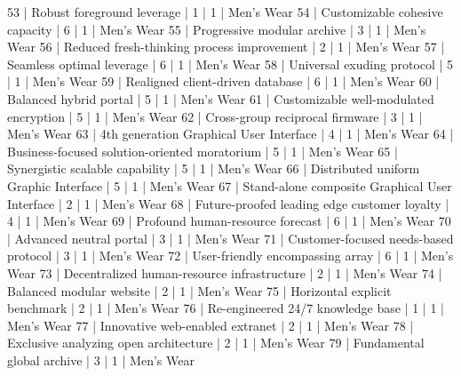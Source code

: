 \begin{enumerate}
\begin{pseudo*}
      53 | Robust foreground leverage                       |        1 |      1 | Men's Wear    
      54 | Customizable cohesive capacity                   |        6 |      1 | Men's Wear    
      55 | Progressive modular archive                      |        3 |      1 | Men's Wear    
      56 | Reduced fresh-thinking process improvement       |        2 |      1 | Men's Wear    
      57 | Seamless optimal leverage                        |        6 |      1 | Men's Wear    
      58 | Universal exuding protocol                       |        5 |      1 | Men's Wear    
      59 | Realigned client-driven database                 |        6 |      1 | Men's Wear    
      60 | Balanced hybrid portal                           |        5 |      1 | Men's Wear    
      61 | Customizable well-modulated encryption           |        5 |      1 | Men's Wear    
      62 | Cross-group reciprocal firmware                  |        3 |      1 | Men's Wear    
      63 | 4th generation Graphical User Interface          |        4 |      1 | Men's Wear    
      64 | Business-focused solution-oriented moratorium    |        5 |      1 | Men's Wear    
      65 | Synergistic scalable capability                  |        5 |      1 | Men's Wear    
      66 | Distributed uniform Graphic Interface            |        5 |      1 | Men's Wear    
      67 | Stand-alone composite Graphical User Interface   |        2 |      1 | Men's Wear    
      68 | Future-proofed leading edge customer loyalty     |        4 |      1 | Men's Wear    
      69 | Profound human-resource forecast                 |        6 |      1 | Men's Wear    
      70 | Advanced neutral portal                          |        3 |      1 | Men's Wear    
      71 | Customer-focused needs-based protocol            |        3 |      1 | Men's Wear    
      72 | User-friendly encompassing array                 |        6 |      1 | Men's Wear    
      73 | Decentralized human-resource infrastructure      |        2 |      1 | Men's Wear    
      74 | Balanced modular website                         |        2 |      1 | Men's Wear    
      75 | Horizontal explicit benchmark                    |        2 |      1 | Men's Wear    
      76 | Re-engineered 24/7 knowledge base                |        1 |      1 | Men's Wear    
      77 | Innovative web-enabled extranet                  |        2 |      1 | Men's Wear    
      78 | Exclusive analyzing open architecture            |        2 |      1 | Men's Wear    
      79 | Fundamental global archive                       |        3 |      1 | Men's Wear    

\end{pseudo*}
\end{enumerate}

